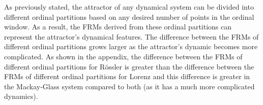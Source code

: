 \documentclass[%
 aip,
 amsmath,amssymb,
 reprint,%
]{revtex4-1}
\begin{document}
As previously stated, the attractor of any dynamical system can be divided into different ordinal partitions based on any desired number of points in the ordinal window. As a result, the FRMs derived from these ordinal partitions can represent the attractor's dynamical features. The difference between the FRMs of different ordinal partitions grows larger as the attractor's dynamic becomes more complicated. 
As shown in the appendix, the difference between the FRMs of different ordinal partitions for R{\"o}ssler is greater than the difference between the FRMs of different ordinal partitions for Lorenz and this difference is greater in the Mackay-Glass system compared to both (as it has a much more complicated dynamics).

\begin{figure}[htbp]
    \centering
    \\[-1pt]
\end{figure}
\end{document}
